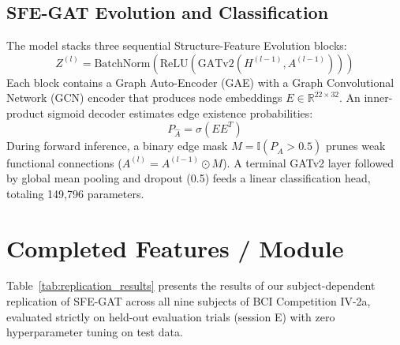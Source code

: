 \documentclass[12pt,a4paper]{report}
\begin{document}
\subsection{SFE-GAT Evolution and Classification}
The model stacks three sequential Structure-Feature Evolution blocks:
\begin{equation}
    Z^{(l)} = \mathrm{BatchNorm}\left(\mathrm{ReLU}\left(\mathrm{GATv2}\left(H^{(l-1)}, A^{(l-1)}\right)\right)\right)
\end{equation}
Each block contains a Graph Auto-Encoder (GAE) with a Graph Convolutional Network (GCN) encoder that produces node embeddings $E \in \mathbb{R}^{22 \times 32}$. An inner-product sigmoid decoder estimates edge existence probabilities:
\begin{equation}
    P_{\hat{A}} = \sigma\left(E E^T\right)
\end{equation}
During forward inference, a binary edge mask $M = \mathbb{I}(P_{\hat{A}} > 0.5)$ prunes weak functional connections ($A^{(l)} = A^{(l-1)} \odot M$). A terminal GATv2 layer followed by global mean pooling and dropout (0.5) feeds a linear classification head, totaling 149,796 parameters.

\section{Completed Features / Module}
Table~\ref{tab:replication_results} presents the results of our subject-dependent replication of SFE-GAT across all nine subjects of BCI Competition IV-2a, evaluated strictly on held-out evaluation trials (session E) with zero hyperparameter tuning on test data.
\end{document}
